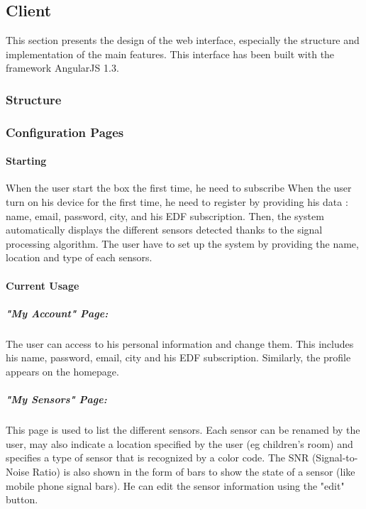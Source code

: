 \subsection{Client} %

This section presents the design of the web interface, especially the structure and implementation of the main features. This interface has been built with the framework AngularJS 1.3.

\subsubsection{Structure}
    
    
\subsubsection{Configuration Pages}
    
    \paragraph{Starting} %
    
    When the user start the box the first time, he need to subscribe 
    When the user turn on his device for the first time, he need to register by providing his data : name, email, password, city, and his EDF subscription. Then, the system automatically displays the different sensors detected thanks to the signal processing algorithm. The user have to set up the system by providing the name, location and type of each sensors. %
    
    \paragraph{Current Usage} %
    
    \subparagraph{"My Account" Page:} 
    The user can access to his personal information and change them. This includes his name, password, email, city and his EDF subscription. Similarly, the profile appears on the homepage.
    
    \subparagraph{"My Sensors" Page:}
    This page is used to list the different sensors. Each sensor can be renamed by the user, may also indicate a location specified by the user (eg children's room) and specifies a type of sensor that is recognized by a color code. The SNR (Signal-to-Noise Ratio) is also shown in the form of bars to show the state of a sensor (like mobile phone signal bars). He can edit the sensor information using the "edit" button.
    
